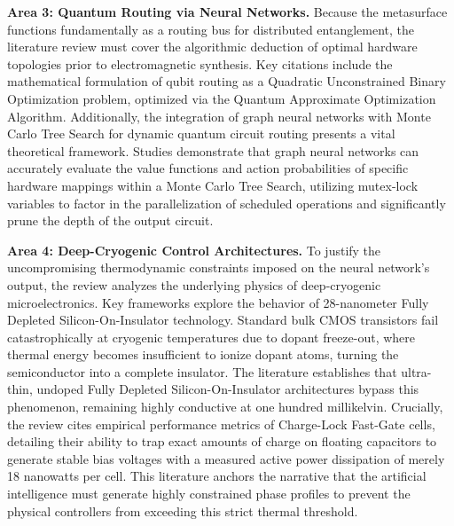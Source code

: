 \documentclass[11pt, a4paper]{article}
\begin{document}
\textbf{Area 3: Quantum Routing via Neural Networks.} Because the metasurface functions fundamentally as a routing bus for distributed entanglement, the literature review must cover the algorithmic deduction of optimal hardware topologies prior to electromagnetic synthesis. Key citations include the mathematical formulation of qubit routing as a Quadratic Unconstrained Binary Optimization problem, optimized via the Quantum Approximate Optimization Algorithm. Additionally, the integration of graph neural networks with Monte Carlo Tree Search for dynamic quantum circuit routing presents a vital theoretical framework. Studies demonstrate that graph neural networks can accurately evaluate the value functions and action probabilities of specific hardware mappings within a Monte Carlo Tree Search, utilizing mutex-lock variables to factor in the parallelization of scheduled operations and significantly prune the depth of the output circuit.

\textbf{Area 4: Deep-Cryogenic Control Architectures.} To justify the uncompromising thermodynamic constraints imposed on the neural network's output, the review analyzes the underlying physics of deep-cryogenic microelectronics. Key frameworks explore the behavior of 28-nanometer Fully Depleted Silicon-On-Insulator technology. Standard bulk CMOS transistors fail catastrophically at cryogenic temperatures due to dopant freeze-out, where thermal energy becomes insufficient to ionize dopant atoms, turning the semiconductor into a complete insulator. The literature establishes that ultra-thin, undoped Fully Depleted Silicon-On-Insulator architectures bypass this phenomenon, remaining highly conductive at one hundred millikelvin. Crucially, the review cites empirical performance metrics of Charge-Lock Fast-Gate cells, detailing their ability to trap exact amounts of charge on floating capacitors to generate stable bias voltages with a measured active power dissipation of merely 18 nanowatts per cell. This literature anchors the narrative that the artificial intelligence must generate highly constrained phase profiles to prevent the physical controllers from exceeding this strict thermal threshold.
\end{document}
